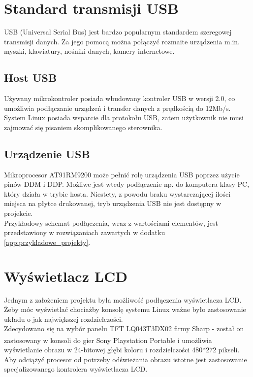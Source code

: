 \documentclass[a4paper,12pt]{book}
\begin{document}
		\section{Standard transmisji USB}
			USB (Universal Serial Bus) jest bardzo popularnym standardem szeregowej transmisji danych. Za jego pomocą można połączyć rozmaite urządzenia m.in. myszki, klawiatury, nośniki danych, kamery internetowe.
			\subsection{Host USB}
				Używany mikrokontroler posiada wbudowany kontroler USB w wersji 2.0, co umożliwia podłączanie urządzeń i transfer danych z prędkością do 12Mb/s.\\
				System Linux posiada wsparcie dla protokołu USB, zatem użytkownik nie musi zajmować się pisaniem skomplikowanego sterownika.
			\subsection{Urządzenie USB}
				Mikroprocesor AT91RM9200 może pełnić rolę urządzenia USB poprzez użycie pinów DDM i DDP. Możliwe jest wtedy podłączenie np. do komputera klasy PC, który działa w trybie hosta. Niestety, z powodu braku wystarczającej ilości miejsca na płytce drukowanej, tryb urządzenia USB nie jest dostępny w projekcie.\\
			Przykładowy schemat podłączenia, wraz z wartościami elementów, jest przedstawiony w rozwiązaniach zawartych w dodatku \ref{app:przykladowe_projekty}.
			
		\section{Wyświetlacz LCD}
			Jednym z założeniem projektu była możliwość podłączenia wyświetlacza LCD. Żeby móc wyświetlać chociażby konsolę systemu Linux ważne było zastosowanie układu o jak największej rozdzielczości.\\
			Zdecydowano się na wybór panelu TFT LQ043T3DX02 firmy Sharp - został on zastosowany w konsoli do gier Sony Playstation Portable\textsuperscript{\textregistered} i umożliwia wyświetlanie obrazu w 24-bitowej głębi koloru i rozdzielczości 480*272 pikseli.\\
			Aby odciążyć procesor od potrzeby odświeżania obrazu istotne jest zastosowanie specjalizowanego kontrolera wyświetlacza LCD.
\end{document}
